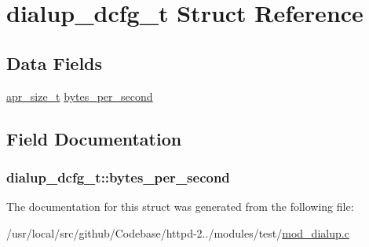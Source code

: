 \hypertarget{structdialup__dcfg__t}{}\section{dialup\+\_\+dcfg\+\_\+t Struct Reference}
\label{structdialup__dcfg__t}
\subsection*{Data Fields}
\begin{DoxyCompactItemize}
\item 
\hyperlink{group__apr__platform_gaaa72b2253f6f3032cefea5712a27540e}{apr\+\_\+size\+\_\+t} \hyperlink{structdialup__dcfg__t_a6465c11129fc5ea680f9436f5e6562da}{bytes\+\_\+per\+\_\+second}
\end{DoxyCompactItemize}


\subsection{Field Documentation}
\subsubsection[{\texorpdfstring{bytes\+\_\+per\+\_\+second}{bytes_per_second}}]{ dialup\+\_\+dcfg\+\_\+t\+::bytes\+\_\+per\+\_\+second}\hypertarget{structdialup__dcfg__t_a6465c11129fc5ea680f9436f5e6562da}{}\label{structdialup__dcfg__t_a6465c11129fc5ea680f9436f5e6562da}


The documentation for this struct was generated from the following file\+:\begin{DoxyCompactItemize}
\item 
/usr/local/src/github/\+Codebase/httpd-\/2../modules/test/\hyperlink{mod__dialup_8c}{mod\+\_\+dialup.\+c}\end{DoxyCompactItemize}
